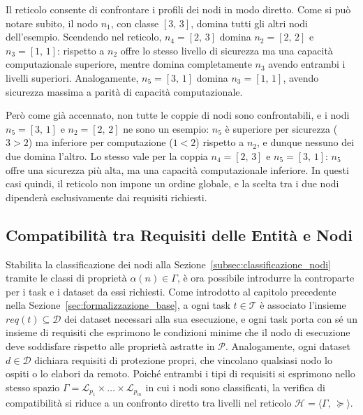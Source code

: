 Il reticolo consente di confrontare i profili dei nodi in modo diretto. Come si può notare subito, il nodo $n_1$, con classe $[3,\,3]$, domina tutti gli altri nodi dell'esempio. Scendendo nel reticolo, $n_4 = [2,\,3]$ domina $n_2 = [2,\,2]$ e $n_3 = [1,\,1]$: rispetto a $n_2$ offre lo stesso livello di sicurezza ma una capacità computazionale superiore, mentre domina completamente $n_3$ avendo entrambi i livelli superiori. Analogamente, $n_5 = [3,\,1]$ domina $n_3 = [1,\,1]$, avendo sicurezza massima a parità di capacità computazionale.

Però come già accennato, non tutte le coppie di nodi sono confrontabili, e i nodi $n_5 = [3,\,1]$ e $n_2 = [2,\,2]$ ne sono un esempio: $n_5$ è superiore per sicurezza ($3 > 2$) ma inferiore per computazione ($1 < 2$) rispetto a $n_2$, e dunque nessuno dei due domina l'altro. Lo stesso vale per la coppia $n_4 = [2,\,3]$ e $n_5 = [3,\,1]$: $n_5$ offre una sicurezza più alta, ma una capacità computazionale inferiore. In questi casi quindi, il reticolo non impone un ordine globale, e la scelta tra i due nodi dipenderà esclusivamente dai requisiti richiesti.


\subsection{Compatibilità tra Requisiti delle Entità e Nodi}
\label{subsec:compatibilita_task_nodi}

Stabilita la classificazione dei nodi alla Sezione~\ref{subsec:classificazione_nodi} tramite le classi di proprietà $\alpha(n) \in \Gamma$, è ora possibile introdurre la controparte per i task e i dataset da essi richiesti. Come introdotto al capitolo precedente nella Sezione~\ref{sec:formalizzazione_base}, a ogni task $t \in \mathcal{T}$ è associato l'insieme $req(t) \subseteq \mathcal{D}$ dei dataset necessari alla sua esecuzione, e ogni task porta con sé un insieme di requisiti che esprimono le condizioni minime che il nodo di esecuzione deve soddisfare rispetto alle proprietà astratte in $\mathcal{P}$. Analogamente, ogni dataset $d \in \mathcal{D}$ dichiara requisiti di protezione propri, che vincolano qualsiasi nodo lo ospiti o lo elabori da remoto. Poiché entrambi i tipi di requisiti si esprimono nello stesso spazio $\Gamma = \mathcal{L}_{p_1} \times \ldots \times \mathcal{L}_{p_m}$ in cui i nodi sono classificati, la verifica di compatibilità si riduce a un confronto diretto tra livelli nel reticolo $\mathcal{H} = \langle \Gamma,\, \succeq \rangle$.

